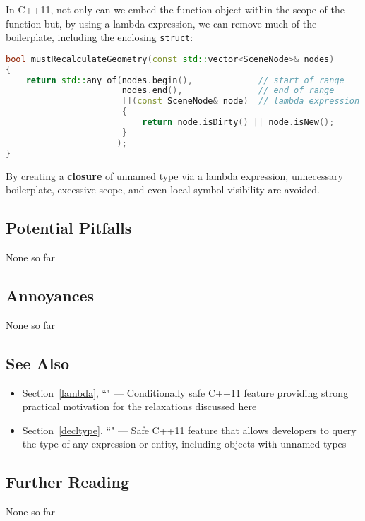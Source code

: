 \noindent In C++11, not only can we embed the function object within the scope of
the function but, by using a lambda expression, we can
remove much of the boilerplate, including the enclosing \texttt{struct}:

\begin{lstlisting}[language=C++]
bool mustRecalculateGeometry(const std::vector<SceneNode>& nodes)
{
    return std::any_of(nodes.begin(),             // start of range
                       nodes.end(),               // end of range
                       [](const SceneNode& node)  // lambda expression
                       {
                           return node.isDirty() || node.isNew();
                       }
                      );
}
\end{lstlisting}

\noindent By creating a \textbf{closure} of unnamed type via a lambda
expression, unnecessary boilerplate, excessive scope, and even local
symbol visibility are avoided.

\subsection[Potential Pitfalls]{Potential Pitfalls}\label{potential-pitfalls}

None so far

\subsection[Annoyances]{Annoyances}\label{annoyances}

None so far

\subsection[See Also]{See Also}\label{see-also}

\begin{itemize}
\item{Section~\ref{lambda}, ``" — Conditionally safe C++11 feature providing strong practical motivation for the relaxations discussed here}
\item{Section~\ref{decltype}, ``" — Safe C++11 feature that allows developers to query the type of any expression or entity, including objects with unnamed types}
\end{itemize}

\subsection[Further Reading]{Further Reading}\label{further-reading}

None so far



